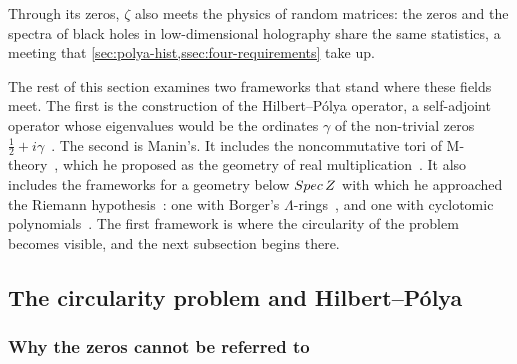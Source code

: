 Through its zeros, $\zeta$ also meets the physics of random matrices: the zeros and the spectra of black holes in
low-dimensional holography share the same statistics, a meeting that \cref{sec:polya-hist,ssec:four-requirements}
take up.

The rest of this section examines two frameworks that stand where these fields meet.  The first is the
construction of the Hilbert--P\'olya operator, a self-adjoint operator whose eigenvalues would be the ordinates
$\gamma$ of the non-trivial zeros $\tfrac12+i\gamma$~\cite{polya1982letter,berry99,connes99}.  The second is
Manin's.  It includes the noncommutative tori of M-theory~\cite{connes98}, which he proposed as the geometry of real
multiplication~\cite{manin04}.  It also includes the frameworks for a geometry below $Spec\,Z$ with which
he approached the Riemann hypothesis~\cite{manin95}: one with Borger's $\Lambda$-rings~\cite{borger09,manin13}, and
one with cyclotomic polynomials~\cite{manin08}.  The first framework is where the circularity of the problem
becomes visible, and the next subsection begins there.

\subsection{The circularity problem and Hilbert--P\'olya}\label{sec:circularity}

\subsubsection{Why the zeros cannot be referred to}

